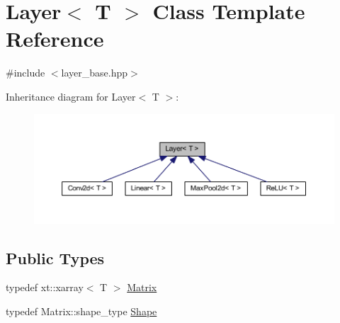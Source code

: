 \hypertarget{class_layer}{}\section{Layer$<$ T $>$ Class Template Reference}
\label{class_layer}


{\ttfamily \#include $<$layer\+\_\+base.\+hpp$>$}



Inheritance diagram for Layer$<$ T $>$\+:
\nopagebreak
\begin{figure}[H]
\begin{center}
\leavevmode
\includegraphics[width=350pt]{class_layer__inherit__graph}
\end{center}
\end{figure}
\subsection*{Public Types}
\begin{DoxyCompactItemize}
\item 
typedef xt\+::xarray$<$ T $>$ \mbox{\hyperlink{class_layer_a22b1e7286096aa62bd245536c8ebdaf1}{Matrix}}
\item 
typedef Matrix\+::shape\+\_\+type \mbox{\hyperlink{class_layer_a8313f42d2292d12dd5d40cc115636693}{Shape}}
\end{DoxyCompactItemize}
